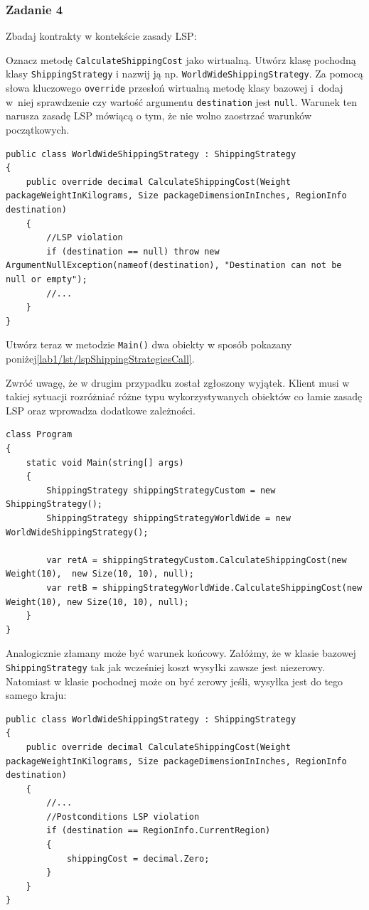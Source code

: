 \subsubsection{Zadanie 4}
Zbadaj kontrakty w kontekście zasady LSP:

Oznacz metodę \texttt{CalculateShippingCost} jako wirtualną. Utwórz klasę pochodną klasy \texttt{ShippingStrategy} i nazwij ją np. \texttt{WorldWideShippingStrategy}. Za pomocą słowa kluczowego \texttt{override} przesłoń wirtualną metodę klasy bazowej i~dodaj w~niej sprawdzenie czy wartość argumentu \texttt{destination} jest \texttt{null}. Warunek ten narusza zasadę LSP mówiącą o tym, że nie wolno zaostrzać warunków początkowych. %
\begin{lstlisting}
public class WorldWideShippingStrategy : ShippingStrategy
{	
	public override decimal CalculateShippingCost(Weight packageWeightInKilograms, Size packageDimensionInInches, RegionInfo destination)
	{
		//LSP violation
		if (destination == null) throw new ArgumentNullException(nameof(destination), "Destination can not be null or empty");
		//...
	}
}
\end{lstlisting}

Utwórz teraz w metodzie \texttt{Main()} dwa obiekty w sposób pokazany poniżej\ref{lab1/lst/lspShippingStrategiesCall}. 

Zwróć uwagę, że w drugim przypadku został zgłoszony wyjątek. Klient musi w takiej sytuacji rozróżniać różne typu wykorzystywanych obiektów co łamie zasadę LSP oraz wprowadza dodatkowe zależności.  

\begin{lstlisting}[caption={Wywołanie metod klas ShippingStrategy oraz WolrdWideShippingStrategy}, label={lab1/lst/lspShippingStrategiesCall}]
class Program
{
	static void Main(string[] args)
	{
		ShippingStrategy shippingStrategyCustom = new ShippingStrategy();
		ShippingStrategy shippingStrategyWorldWide = new WorldWideShippingStrategy();
		
		var retA = shippingStrategyCustom.CalculateShippingCost(new Weight(10),  new Size(10, 10), null);
		var retB = shippingStrategyWorldWide.CalculateShippingCost(new Weight(10), new Size(10, 10), null);
	}
}
\end{lstlisting}

Analogicznie złamany może być warunek końcowy. Załóżmy, że w klasie bazowej \texttt{ShippingStrategy} tak jak wcześniej koszt wysyłki zawsze jest niezerowy. Natomiast w klasie pochodnej może on być zerowy jeśli, wysyłka jest do tego samego kraju: %
\begin{lstlisting}
public class WorldWideShippingStrategy : ShippingStrategy
{	
	public override decimal CalculateShippingCost(Weight packageWeightInKilograms, Size packageDimensionInInches, RegionInfo destination)
	{
		//...
		//Postconditions LSP violation 
		if (destination == RegionInfo.CurrentRegion)
		{
			shippingCost = decimal.Zero;
		}
	}
}
\end{lstlisting}

